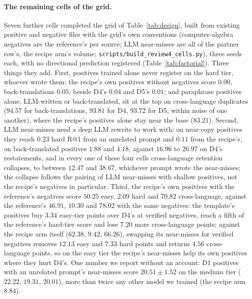 \paragraph{The remaining cells of the grid.}Seven further cells completed the grid of Table~\ref{tab:design}, built from existing positive and negative files with the grid's own conventions (computer-algebra negatives are the reference's per source; LLM near-misses are all of the partner row's, the recipe arm's volume; \texttt{scripts/build\_review4\_cells.py}), three seeds each, with no directional prediction registered (Table~\ref{tab:factorial}). Three things they add. First, positives trained alone never register on the hard tier, whoever wrote them: the recipe's own positives without negatives score $0.00$, back-translations $0.05$, beside D4's $0.04$ and D5's $0.01$; and paraphrase positives alone, LLM-written or back-translated, sit at the top on cross-language duplicates ($94.57$ for back-translations, $93.81$ for D4, $93.72$ for D5, within noise of one another), where the recipe's positives alone stay near the base ($83.21$). Second, LLM near-misses need a deep LLM rewrite to work with: on near-copy positives they reach $0.23$ hard R@1 from an unrelated prompt and $0.11$ from the recipe's, on back-translated positives $1.88$ and $4.18$, against $16.96$ to $26.97$ on D4's restatements, and in every one of these four cells cross-language retention collapses, to between $12.47$ and $38.67$, whichever prompt wrote the near-misses; the collapse follows the pairing of LLM near-misses with shallow positives, not the recipe's negatives in particular. Third, the recipe's own positives with the reference's negatives score $50.25$ easy, $2.09$ hard and $70.82$ cross-language, against the reference's $46.91$, $10.30$ and $78.02$ with the same negatives: the template's positives buy $3.34$ easy-tier points over D4's at verified negatives, reach a fifth of the reference's hard-tier score and lose $7.20$ more cross-language points; against the recipe arm itself ($62.38$, $9.42$, $66.26$), swapping its near-misses for verified negatives removes $12.13$ easy and $7.33$ hard points and returns $4.56$ cross-language points, so on the easy tier the recipe's near-misses help its own positives where they hurt D4's. One number we report without an account: D1 positives with an unrelated prompt's near-misses score $20.51 \pm 1.52$ on the medium tier ($22.22$, $19.31$, $20.01$), more than twice any other model we trained (the recipe arm $8.84$).

